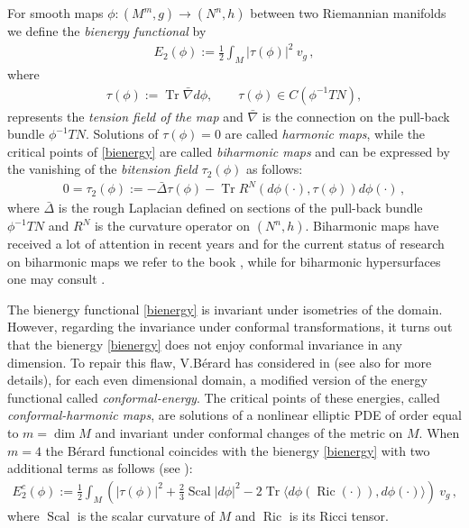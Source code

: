 \documentclass[11pt,leqno]{amsart}
\theoremstyle{plain}
\theoremstyle{definition}
\numberwithin{equation}{section}
\newcommand{\Ric}{\operatorname{Ric}}
\newcommand{\Scal}{\operatorname{Scal}}
\DeclareMathOperator{\trace}{Tr}
\numberwithin{equation}{section}
\begin{document}
For smooth maps  \(\phi:(M^m,g)\to(N^n,h)\) between two Riemannian manifolds we define the \emph{bienergy functional} by
\begin{align}
\label{bienergy}
E_2(\phi):=\frac{1}{2}\int_M|\tau(\phi)|^2 \ v_g\,,
\end{align}
where 
\begin{align*}
\tau(\phi):=\trace\bar\nabla d\phi, \qquad \tau(\phi)\in C\left(\phi^{-1}TN\right),
\end{align*}
represents the {\em tension field of the map} and \(\bar\nabla\) is the connection on the pull-back bundle \(\phi^{-1}TN\). Solutions of $\tau(\phi)=0$ are called {\em harmonic maps}, while the critical points of \eqref{bienergy} are called \emph{biharmonic maps} and can be expressed by the vanishing of the \emph{bitension field} \(\tau_2(\phi)\) as follows:
\begin{align}
\label{bitension}
0=\tau_2(\phi):=-\bar\Delta\tau(\phi)-\trace R^N(d\phi(\cdot), \tau(\phi))d\phi(\cdot)\,,
\end{align}
where $\bar\Delta$ is the rough Laplacian defined on sections of the pull-back bundle \(\phi^{-1}TN\) and $R^N$
is the curvature operator on $(N^n,h)$.
Biharmonic maps have received a lot of attention in recent years and for the current status of research on biharmonic maps we refer to the book \cite{MR4265170}, while for biharmonic hypersurfaces one may consult \cite{MR4410183}.

The bienergy functional \eqref{bienergy} is invariant under isometries of the domain.
However, regarding the invariance under conformal transformations, it turns out that the bienergy \eqref{bienergy} does not enjoy conformal invariance in any dimension. To repair this flaw, V.Bérard has considered in \cite{MR2449641,MR2722777} (see also \cite{MR3028564} for more details), for each even dimensional domain, a modified version of the energy functional called {\it conformal-energy}. The critical points of these energies, called \textit{conformal-harmonic maps}, are solutions of a nonlinear elliptic PDE of order equal to $m=\dim M$ and invariant under conformal changes of the metric on $M$.  When $m=4$ the B\'erard functional coincides with the bienergy \eqref{bienergy} with two additional terms as follows (see \cite{MR2449641}):
\begin{align}
\label{bienergy-conformal}
E^c_2(\phi):=\frac{1}{2}\int_M \left(|\tau(\phi)|^2+\frac{2}{3}\Scal |d\phi|^2-2\trace\langle d\phi\left(\Ric(\cdot)\right), d\phi(\cdot)\rangle\right) \ v_g\,,
\end{align}
where \(\Scal\) is the scalar curvature of \(M\) and \(\Ric\) is its Ricci tensor.
\end{document}
